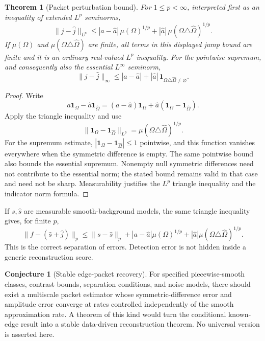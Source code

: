\documentclass[11pt,letterpaper]{article}
\newtheorem{theorem}{Theorem}[section]
\theoremstyle{plain}
\theoremstyle{plain}
\theoremstyle{plain}
\theoremstyle{definition}
\theoremstyle{definition}
\theoremstyle{definition}
\theoremstyle{definition}
\newtheorem{conjecture}[conjecture]{Conjecture}
\theoremstyle{remark}
\theoremstyle{remark}
\theoremstyle{remark}
\theoremstyle{remark}
\let\KomorebiPrimitiveWidehat\widehat
\renewcommand{\widehat}[1]{\KomorebiPrimitiveWidehat{#1}}
\begin{document}
\begin{theorem}[Packet perturbation bound]\label{result:12}
For $1\le p<\infty$, interpreted first as an inequality of extended $L^p$ seminorms,
\[
\boxed{
\|j-\widehat j\|_{L^p}
\le
|a-\widehat a|\,\mu(\Omega)^{1/p}
+
|\widehat a|\,\mu(\Omega\triangle\widehat\Omega)^{1/p}.
}
\]
If $\mu(\Omega)$ and $\mu(\Omega\triangle\widehat\Omega)$ are finite, all terms in this displayed jump bound are finite and it is an ordinary real-valued $L^p$ inequality. For the pointwise supremum, and consequently also the essential $L^\infty$ seminorm,
\[
\|j-\widehat j\|_{\infty}
\le |a-\widehat a|+|\widehat a|\,
\mathbf 1_{\Omega\triangle\widehat\Omega\ne\varnothing}.
\]
\end{theorem}

\begin{proof}
Write
\[
a\mathbf 1_{\Omega}-\widehat a\mathbf 1_{\widehat\Omega}
=(a-\widehat a)\mathbf 1_{\Omega}
+\widehat a(\mathbf 1_{\Omega}-\mathbf 1_{\widehat\Omega}).
\]
Apply the triangle inequality and use
\[
\|\mathbf 1_{\Omega}-\mathbf 1_{\widehat\Omega}\|_{L^p}
=\mu(\Omega\triangle\widehat\Omega)^{1/p}.
\]
For the supremum estimate, $|\mathbf1_\Omega-\mathbf1_{\widehat\Omega}|\le1$ pointwise, and this function vanishes everywhere when the symmetric difference is empty. The same pointwise bound also bounds the essential supremum. Nonempty null symmetric differences need not contribute to the essential norm; the stated bound remains valid in that case and need not be sharp. Measurability justifies the $L^p$ triangle inequality and the indicator norm formula.
\end{proof}

If $s,\widehat s$ are measurable smooth-background models, the same triangle inequality gives, for finite $p$,
\[
\boxed{
\|f-(\widehat s+\widehat j)\|_p
\le
\|s-\widehat s\|_p
+|a-\widehat a|\mu(\Omega)^{1/p}
+|\widehat a|\mu(\Omega\triangle\widehat\Omega)^{1/p}.
}
\]
This is the correct separation of errors. Detection error is not hidden inside a generic reconstruction score.

\begin{conjecture}[Stable edge-packet recovery]\label{core:record:17}
For specified piecewise-smooth classes, contrast bounds, separation conditions, and noise models, there should exist a multiscale packet estimator whose symmetric-difference error and amplitude error converge at rates controlled independently of the smooth approximation rate. A theorem of this kind would turn the conditional known-edge result into a stable data-driven reconstruction theorem. No universal version is asserted here.
\end{conjecture}
\end{document}
